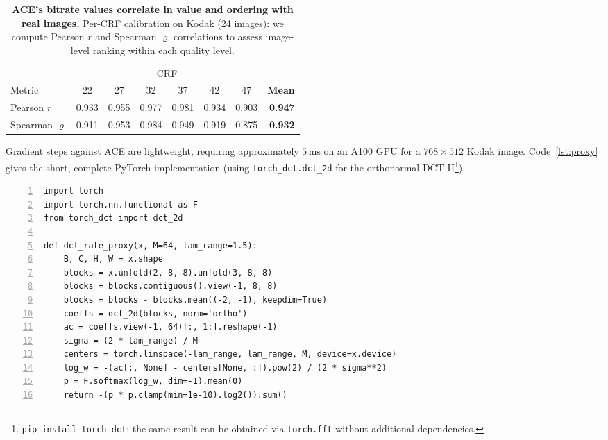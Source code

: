 \documentclass{article}
\theoremstyle{definition}
\begin{document}
\begin{table}[ht]
  \centering
  \small
  \caption{
  \textbf{ACE's bitrate values correlate in value and ordering with real images.}
  Per-CRF calibration on Kodak (24 images): we compute Pearson $r$ and Spearman $\varrho$ correlations to assess image-level ranking within each quality level.}
  \label{tab:calibration}
  \begin{tabular}{lccccccr}
    \toprule
     & \multicolumn{6}{c}{CRF} & \\
    \cmidrule(lr){2-7}
    Metric & 22 & 27 & 32 & 37 & 42 & 47 & \textbf{Mean} \\
    \midrule
    Pearson $r$      & 0.933 & 0.955 & 0.977 & 0.981 & 0.934 & 0.903 & \textbf{0.947} \\
    Spearman $\varrho$ & 0.911 & 0.953 & 0.984 & 0.949 & 0.919 & 0.875 & \textbf{0.932} \\
    \bottomrule
  \end{tabular}
\end{table}

Gradient steps against ACE are lightweight, requiring approximately $5\,\text{ms}$ on an A100 GPU for a $768\times512$ Kodak image.
Code~\ref{lst:proxy} gives the short, complete PyTorch implementation (using \texttt{torch\_dct.dct\_2d} for the orthonormal DCT-II\footnote{\texttt{pip install torch-dct}; the same result can be obtained via \texttt{torch.fft} without additional dependencies.}).

\begin{tcolorbox}[
    left=0mm, right=0mm, top=0mm, bottom=-1mm,
    title=Code \ref{lst:proxy},
    label={lst:proxy}
]
\begin{lstlisting}[numbers=left, xleftmargin=2em, numbersep=1em, frame=none]
import torch
import torch.nn.functional as F
from torch_dct import dct_2d

def dct_rate_proxy(x, M=64, lam_range=1.5):
    B, C, H, W = x.shape
    blocks = x.unfold(2, 8, 8).unfold(3, 8, 8)
    blocks = blocks.contiguous().view(-1, 8, 8)
    blocks = blocks - blocks.mean((-2, -1), keepdim=True)
    coeffs = dct_2d(blocks, norm='ortho')
    ac = coeffs.view(-1, 64)[:, 1:].reshape(-1)
    sigma = (2 * lam_range) / M
    centers = torch.linspace(-lam_range, lam_range, M, device=x.device)
    log_w = -(ac[:, None] - centers[None, :]).pow(2) / (2 * sigma**2)
    p = F.softmax(log_w, dim=-1).mean(0)
    return -(p * p.clamp(min=1e-10).log2()).sum()
\end{lstlisting}
\end{tcolorbox}
\end{document}
